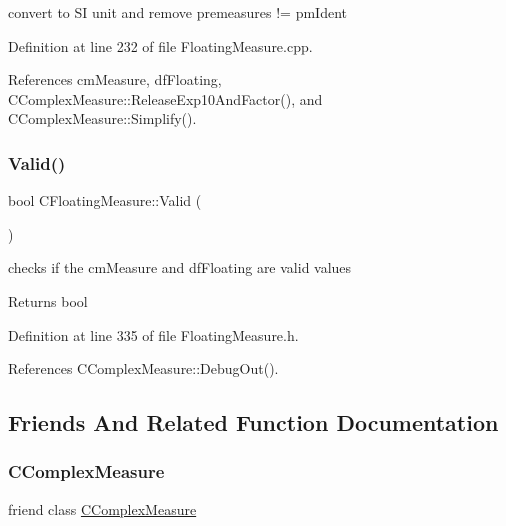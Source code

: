convert to SI unit and remove premeasures != pm\+Ident 



Definition at line 232 of file Floating\+Measure.\+cpp.



References cm\+Measure, df\+Floating, C\+Complex\+Measure\+::\+Release\+Exp10\+And\+Factor(), and C\+Complex\+Measure\+::\+Simplify().

\mbox{\label{classCFloatingMeasure_a0ff3ae036cd2ee44d6b2eadc609b1d1a}} 
\subsubsection{\texorpdfstring{Valid()}{Valid()}}
{\footnotesize\ttfamily bool C\+Floating\+Measure\+::\+Valid (\begin{DoxyParamCaption}{ }\end{DoxyParamCaption})\hspace{0.3cm}{\ttfamily [inline]}}



checks if the cm\+Measure and df\+Floating are valid values 

\begin{DoxyReturn}{Returns}
bool 
\end{DoxyReturn}


Definition at line 335 of file Floating\+Measure.\+h.



References C\+Complex\+Measure\+::\+Debug\+Out().



\subsection{Friends And Related Function Documentation}
\mbox{\label{classCFloatingMeasure_a2af9f0d4f7a8de5099b8d23df211b616}} 
\subsubsection{\texorpdfstring{C\+Complex\+Measure}{CComplexMeasure}}
{\footnotesize\ttfamily friend class \hyperlink{classCComplexMeasure}{C\+Complex\+Measure}\hspace{0.3cm}{\ttfamily [friend]}}



